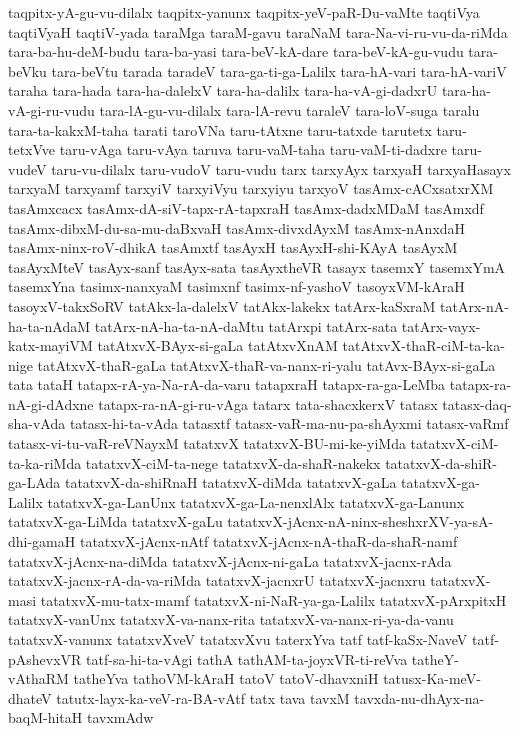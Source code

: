 {taqpitx-yA-gu-vu-dilalx
taqpitx-yanunx
taqpitx-yeV-paR-Du-vaMte
taqtiVya
taqtiVyaH
taqtiV-yada
taraMga
taraM-gavu
taraNaM
tara-Na-vi-ru-vu-da-riMda
tara-ba-hu-deM-budu
tara-ba-yasi
tara-beV-kA-dare
tara-beV-kA-gu-vudu
tara-beVku
tara-beVtu
tarada
taradeV
tara-ga-ti-ga-Lalilx
tara-hA-vari
tara-hA-variV
taraha
tara-hada
tara-ha-dalelxV
tara-ha-dalilx
tara-ha-vA-gi-dadxrU
tara-ha-vA-gi-ru-vudu
tara-lA-gu-vu-dilalx
tara-lA-revu
taraleV
tara-loV-suga
taralu
tara-ta-kakxM-taha
tarati
taroVNa
taru-tAtxne
taru-tatxde
tarutetx
taru-tetxVve
taru-vAga
taru-vAya
taruva
taru-vaM-taha
taru-vaM-ti-dadxre
taru-vudeV
taru-vu-dilalx
taru-vudoV
taru-vudu
tarx
tarxyAyx
tarxyaH
tarxyaHasayx
tarxyaM
tarxyamf
tarxyiV
tarxyiVyu
tarxyiyu
tarxyoV
tasAmx-cACxsatxrXM
tasAmxcacx
tasAmx-dA-siV-tapx-rA-tapxraH
tasAmx-dadxMDaM
tasAmxdf
tasAmx-dibxM-du-sa-mu-daBxvaH
tasAmx-divxdAyxM
tasAmx-nAnxdaH
tasAmx-ninx-roV-dhikA
tasAmxtf
tasAyxH
tasAyxH-shi-KAyA
tasAyxM
tasAyxMteV
tasAyx-sanf
tasAyx-sata
tasAyxtheVR
tasayx
tasemxY
tasemxYmA
tasemxYna
tasimx-nanxyaM
tasimxnf
tasimx-nf-yashoV
tasoyxVM-kAraH
tasoyxV-takxSoRV
tatAkx-la-dalelxV
tatAkx-lakekx
tatArx-kaSxraM
tatArx-nA-ha-ta-nAdaM
tatArx-nA-ha-ta-nA-daMtu
tatArxpi
tatArx-sata
tatArx-vayx-katx-mayiVM
tatAtxvX-BAyx-si-gaLa
tatAtxvXnAM
tatAtxvX-thaR-ciM-ta-ka-nige
tatAtxvX-thaR-gaLa
tatAtxvX-thaR-va-nanx-ri-yalu
tatAvx-BAyx-si-gaLa
tata
tataH
tatapx-rA-ya-Na-rA-da-varu
tatapxraH
tatapx-ra-ga-LeMba
tatapx-ra-nA-gi-dAdxne
tatapx-ra-nA-gi-ru-vAga
tatarx
tata-shacxkerxV
tatasx
tatasx-daq-sha-vAda
tatasx-hi-ta-vAda
tatasxtf
tatasx-vaR-ma-nu-pa-shAyxmi
tatasx-vaRmf
tatasx-vi-tu-vaR-reVNayxM
tatatxvX
tatatxvX-BU-mi-ke-yiMda
tatatxvX-ciM-ta-ka-riMda
tatatxvX-ciM-ta-nege
tatatxvX-da-shaR-nakekx
tatatxvX-da-shiR-ga-LAda
tatatxvX-da-shiRnaH
tatatxvX-diMda
tatatxvX-gaLa
tatatxvX-ga-Lalilx
tatatxvX-ga-LanUnx
tatatxvX-ga-La-nenxlAlx
tatatxvX-ga-Lanunx
tatatxvX-ga-LiMda
tatatxvX-gaLu
tatatxvX-jAcnx-nA-ninx-sheshxrXV-ya-sA-dhi-gamaH
tatatxvX-jAcnx-nAtf
tatatxvX-jAcnx-nA-thaR-da-shaR-namf
tatatxvX-jAcnx-na-diMda
tatatxvX-jAcnx-ni-gaLa
tatatxvX-jacnx-rAda
tatatxvX-jacnx-rA-da-va-riMda
tatatxvX-jacnxrU
tatatxvX-jacnxru
tatatxvX-masi
tatatxvX-mu-tatx-mamf
tatatxvX-ni-NaR-ya-ga-Lalilx
tatatxvX-pArxpitxH
tatatxvX-vanUnx
tatatxvX-va-nanx-rita
tatatxvX-va-nanx-ri-ya-da-vanu
tatatxvX-vanunx
tatatxvXveV
tatatxvXvu
taterxYva
tatf
tatf-kaSx-NaveV
tatf-pAshevxVR
tatf-sa-hi-ta-vAgi
tathA
tathAM-ta-joyxVR-ti-reVva
tatheY-vAthaRM
tatheYva
tathoVM-kAraH
tatoV
tatoV-dhavxniH
tatusx-Ka-meV-dhateV
tatutx-layx-ka-veV-ra-BA-vAtf
tatx
tava
tavxM
tavxda-nu-dhAyx-na-baqM-hitaH
tavxmAdw
}
